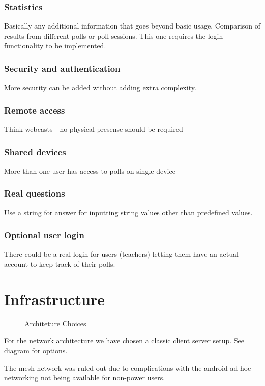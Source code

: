 \documentclass{acm_proc_article-sp}
\begin{document}
\subsubsection*{Statistics}
Basically any additional information that goes beyond basic usage. Comparison of results from different polls or poll sessions. This one requires the login functionality to be implemented.

\subsubsection*{Security and authentication}
More security can be added without adding extra complexity.
\subsubsection*{Remote access}
Think webcasts - no physical presense should be required
\subsubsection*{Shared devices}
More than one user has access to polls on single device
\subsubsection*{Real questions}
Use a string for answer for inputting string values other than predefined values.

\subsubsection*{Optional user login}
There could be a real login for users (teachers) letting them have an actual account to keep track of their polls.

\section{Infrastructure}
\thispagestyle{fancy}%

\begin{figure}[h]
\centering
{}
\caption{Architeture Choices}
\label{fig:architeture_choices}
\end{figure}

For the network architecture we have chosen a classic client server setup. See diagram for options.

The mesh network was ruled out due to complications with the android ad-hoc networking not being available for non-power users.
\end{document}
